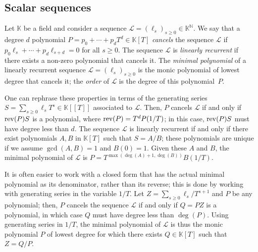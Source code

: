 \documentclass[12pt]{article}
\newcommand{\genseries}{Z}
\newcommand{\minpoly}{P}
\def\N {\ensuremath{\mathbb{N}}}
\def\K{\mathbb{K}}
\def\K {\ensuremath{\mathbb{K}}}
\begin{document}
\subsection{Scalar sequences} \label{section:linseq}

Let $\K$ be a field and consider a sequence $\mathcal{L}=(\ell_s)_{s
  \ge 0} \in \K^\N$. We say that a degree $d$ polynomial $\minpoly =
p_0 + \cdots + p_d T^d \in\K[T]$ {\em cancels} the sequence
$\mathcal{L}$ if $p_0 \ell_s + \cdots + p_d \ell_{s+d}=0$ for all $s
\ge 0$. The sequence $\mathcal{L}$ is {\em linearly recurrent} if
there exists a non-zero polynomial that cancels it.  The {\em minimal
  polynomial} of a linearly recurrent sequence
$\mathcal{L}=(\ell_s)_{s \ge 0}$ is the monic polynomial of lowest
degree that cancels it; the {\em order} of $\mathcal{L}$ is the degree
of this polynomial~$\minpoly$.

One can rephrase these properties in terms of the generating series $S=\sum_{s
\ge 0} \ell_s T^s \in \K[[T]]$ associated to $\mathcal{L}$.  Then, $\minpoly$
cancels $\mathcal{L}$ if and only if ${\rm rev}(\minpoly) S$ is a polynomial,
where ${\rm rev}(\minpoly)=T^d \minpoly(1/T)$; in this case, ${\rm
rev}(\minpoly) S$ must have degree less than $d$.  The sequence $\mathcal{L}$
is linearly recurrent if and only if there exist polynomials $A,B$ in $\K[T]$
such that $S=A/B$; these polynomials are unique if we assume $\gcd(A,B)=1$ and
$B(0)=1$.  Given these $A$ and $B$, the minimal polynomial of $\mathcal{L}$ is
$\minpoly = T^{\max(\deg(A)+1,\deg(B))}B(1/T)$. 

It is often easier to work with a closed form that has the actual
minimal polynomial as its denominator, rather than its reverse; this
is done by working with generating series in the variable $1/T$.  Let
$\genseries = \sum_{s\ge0} \ell_s / T^{s+1}$ and $\minpoly$
be any polynomial; then, $\minpoly$ cancels the sequence $\mathcal{L}$
if and only if $Q=\minpoly \genseries $ is a polynomial, in which case $Q$
must have degree less than $\deg(\minpoly)$.  Using generating series in
$1/T$, the minimal polynomial of $\mathcal{L}$ is thus the
monic polynomial $\minpoly$ of lowest degree for which there exists $Q \in
\K[T]$ such that $\genseries=Q/\minpoly$.
\end{document}
